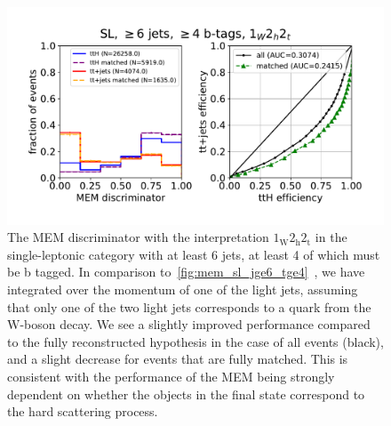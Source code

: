 \begin{figure}
\begin{centering}
\includegraphics[width = 1.0\textwidth]{figures/mem_sl_jge6_tge4_1w2h2t.pdf}
\caption{The MEM discriminator with the interpretation $1_{\mathrm{W}} 2_{\mathrm{h}} 2_{\mathrm{t}}$ in the single-leptonic category with at least 6 jets, at least 4 of which must be b tagged. In comparison to~\cref{fig:mem_sl_jge6_tge4}~, we have integrated over the momentum of one of the light jets, assuming that only one of the two light jets corresponds to a quark from the $\mathrm{W}$-boson decay. We see a slightly improved performance compared to the fully reconstructed hypothesis in the case of all events (black), and a slight decrease for events that are fully matched. This is consistent with the performance of the MEM being strongly dependent on whether the objects in the final state correspond to the hard scattering process.}
\label{fig:mem_sl_jge6_tge4_1w2h2t}
\end{centering}
\end{figure}

